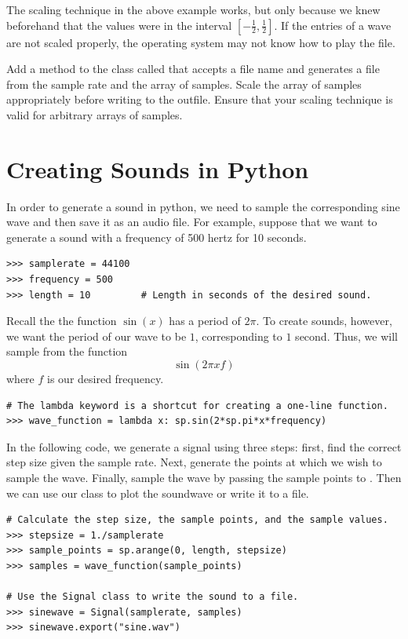 The scaling technique in the above example works, but only because we knew beforehand that the values were in the interval $[-\frac{1}{2}, \frac{1}{2}]$.
If the entries of a wave are not scaled properly, the operating system may not know how to play the file.

\begin{problem}
Add a method to the  class called  that accepts a file name and generates a  file from the sample rate and the array of samples.
Scale the array of samples appropriately before writing to the outfile.
Ensure that your scaling technique is valid for arbitrary arrays of samples.
\end{problem}

\section*{Creating Sounds in Python}

In order to generate a sound in python, we need to sample the corresponding sine wave and then save it as an audio file.
For example, suppose that we want to generate a sound with a frequency of 500 hertz for 10 seconds.

\begin{lstlisting}
>>> samplerate = 44100
>>> frequency = 500
>>> length = 10         # Length in seconds of the desired sound.
\end{lstlisting}

Recall the the function $\sin(x)$ has a period of $2\pi$.
To create sounds, however, we want the period of our wave to be $1$, corresponding to $1$ second.
Thus, we will sample from the function
\[
\sin(2\pi xf)
\]
where $f$ is our desired frequency.

\begin{lstlisting}
# The lambda keyword is a shortcut for creating a one-line function.
>>> wave_function = lambda x: sp.sin(2*sp.pi*x*frequency)
\end{lstlisting}

In the following code, we generate a signal using three steps: first, find the correct step size given the sample rate.
Next, generate the points at which we wish to sample the wave.
Finally, sample the wave by passing the sample points to .
Then we can use our  class to plot the soundwave or write it to a file.

\begin{lstlisting}
# Calculate the step size, the sample points, and the sample values.
>>> stepsize = 1./samplerate
>>> sample_points = sp.arange(0, length, stepsize)
>>> samples = wave_function(sample_points)

# Use the Signal class to write the sound to a file.
>>> sinewave = Signal(samplerate, samples)
>>> sinewave.export("sine.wav")
\end{lstlisting}

